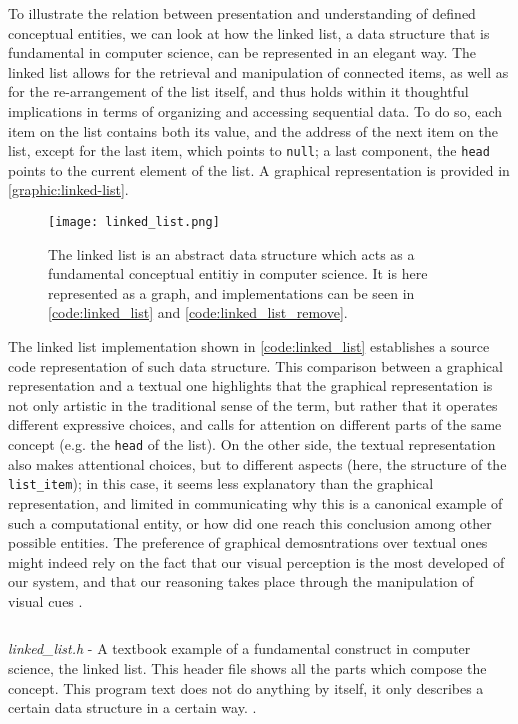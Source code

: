 To illustrate the relation between presentation and understanding of defined conceptual entities, we can look at how the linked list, a data structure that is fundamental in computer science, can be represented in an elegant way. The linked list allows for the retrieval and manipulation of connected items, as well as for the re-arrangement of the list itself, and thus holds within it thoughtful implications in terms of organizing and accessing sequential data. To do so, each item on the list contains both its value, and the address of the next item on the list, except for the last item, which points to \lstinline{null}; a last component, the \lstinline{head} points to the current element of the list. A graphical representation is provided in \autoref{graphic:linked-list}.

\begin{figure}
    \texttt{[image: linked\_list.png]}
    \caption{The linked list is an abstract data structure which acts as a fundamental conceptual entitiy in computer science. It is here represented as a graph, and implementations can be seen in \autoref{code:linked_list} and \autoref{code:linked_list_remove}.}
    \label{graphic:linked-list}
\end{figure}

The linked list implementation shown in \autoref{code:linked_list} establishes a source code representation of such data structure. This comparison between a graphical representation and a textual one highlights that the graphical representation is not only artistic in the traditional sense of the term, but rather that it  operates different expressive choices, and calls for attention on different parts of the same concept (e.g. the \lstinline{head} of the list). On the other side, the textual representation also makes attentional choices, but to different aspects (here, the structure of the \lstinline{list_item}); in this case, it seems less explanatory than the graphical representation, and limited in communicating why this is a canonical example of such a computational entity, or how did one reach this conclusion among other possible entities. The preference of graphical demosntrations over textual ones might indeed rely on the fact that our visual perception is the most developed of our system, and that our reasoning takes place through the manipulation of visual cues \citep{wallen_form_1990}.

\begin{listing}
    \inputminted{c}{./corpus/linked_list.h}
    \caption{\emph{linked\_list.h} - A textbook example of a fundamental construct in computer science, the linked list. This header file shows all the parts which compose the concept. This program text does not do anything by itself, it only describes a certain data structure in a certain way. \citep{kirchner_linked_2022}.}
    \label{code:linked_list}
\end{listing}


